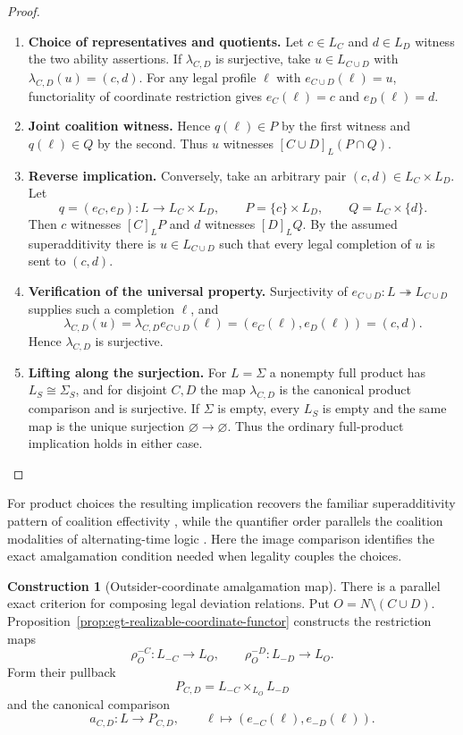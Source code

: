 \documentclass[11pt,a4paper]{article}
\numberwithin{equation}{section}
\theoremstyle{definition}
\newtheorem{construction}[construction]{Construction}
\theoremstyle{remark}
\theoremstyle{plain}
\begin{document}
\begin{proof}
\leavevmode
\begin{enumerate}[label=\textup{(\arabic*)},leftmargin=*,itemsep=4pt,topsep=3pt]
  \item \textbf{Choice of representatives and quotients.} Let $c\in L_C$ and $d\in L_D$ witness the two ability assertions. If
$\lambda_{C,D}$ is surjective, take $u\in L_{C\cup D}$ with
$\lambda_{C,D}(u)=(c,d)$. For any legal profile $\ell$ with
$e_{C\cup D}(\ell)=u$, functoriality of coordinate restriction gives
$e_C(\ell)=c$ and $e_D(\ell)=d$.
  \item \textbf{Joint coalition witness.} Hence $q(\ell)\in P$ by the first witness
and $q(\ell)\in Q$ by the second. Thus $u$ witnesses
$[C\cup D]_L(P\cap Q)$.
  \item \textbf{Reverse implication.} Conversely, take an arbitrary pair $(c,d)\in L_C\times L_D$. Let
\[
 q=(e_C,e_D):L\longrightarrow L_C\times L_D,
 \qquad
 P=\{c\}\times L_D,
 \qquad
 Q=L_C\times\{d\}.
\]
Then $c$ witnesses $[C]_LP$ and $d$ witnesses $[D]_LQ$. By the assumed
superadditivity there is $u\in L_{C\cup D}$ such that every legal completion
of $u$ is sent to $(c,d)$.
  \item \textbf{Verification of the universal property.} Surjectivity of
$e_{C\cup D}:L\twoheadrightarrow L_{C\cup D}$ supplies such a completion
$\ell$, and
\[
 \lambda_{C,D}(u)
 =\lambda_{C,D}e_{C\cup D}(\ell)
 =(e_C(\ell),e_D(\ell))
 =(c,d).
\]
Hence $\lambda_{C,D}$ is surjective.
  \item \textbf{Lifting along the surjection.} For $L=\Sigma$ a nonempty full product has
$L_S\cong\Sigma_S$, and for disjoint $C,D$ the map $\lambda_{C,D}$ is the
canonical product comparison and is surjective. If $\Sigma$ is empty, every
$L_S$ is empty and the same map is the unique surjection
$\varnothing\to\varnothing$. Thus the ordinary full-product implication
holds in either case.
\end{enumerate}
\end{proof}


For product choices the resulting implication recovers the familiar
superadditivity pattern of coalition effectivity
\citet{Pauly2002}, while the quantifier order parallels the
coalition modalities of alternating-time logic \citep{AlurEtAl2002}.
Here the image comparison identifies the exact amalgamation condition
needed when legality couples the choices.

\begin{construction}[Outsider-coordinate amalgamation map]
There is a parallel exact criterion for composing legal deviation relations.
Put $O=N\setminus(C\cup D)$. Proposition~\ref{prop:egt-realizable-coordinate-functor}
constructs the restriction maps
\[
 \rho_O^{-C}:L_{-C}\to L_O,
 \qquad
 \rho_O^{-D}:L_{-D}\to L_O.
\]
Form their pullback
\[
 P_{C,D}=L_{-C}\times_{L_O}L_{-D}
\]
and the canonical comparison
\begin{equation}
\label{eq:egt-deviation-amalgamation-map}
 a_{C,D}:L\longrightarrow P_{C,D},
 \qquad
 \ell\longmapsto(e_{-C}(\ell),e_{-D}(\ell)).
\end{equation}
\end{construction}
\end{document}
